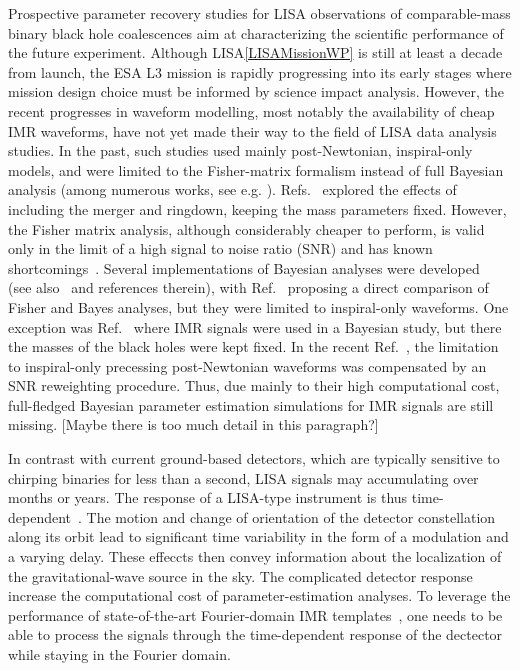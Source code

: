 \documentclass[aps,showpacs,twocolumn,
prd,superscriptaddress,nofootinbib]{revtex4-1}
\newcommand{\jgb}[1]{{\color{DarkGreen} #1}}
\begin{document}
Prospective parameter recovery studies for LISA observations of comparable-mass binary black hole coalescences aim at characterizing the scientific performance of the future experiment. Although LISA\ref{LISAMissionWP} is still at least a decade from launch, the ESA L3 mission is rapidly progressing into its early stages where mission design choice must be informed by science impact analysis. However, the recent progresses in waveform modelling, most notably the availability of cheap IMR waveforms, have not yet made their way to the field of LISA data analysis studies. In the past, such studies used mainly post-Newtonian, inspiral-only models, and were limited to the Fisher-matrix formalism instead of full Bayesian analysis (among numerous works, see e.g. \cite{Cutler97,LISAPE09}). Refs.~\cite{McWilliams+09,McWilliams+10,McWilliams+11} explored the effects of including the merger and ringdown, keeping the mass parameters fixed. However, the Fisher matrix analysis, although considerably cheaper to perform, is valid only in the limit of a high signal to noise ratio (SNR) and has known shortcomings~\cite{Vallisneri08}. Several implementations of Bayesian analyses were developed~\cite{CP06,Wickham+06,Babak+08,GP09,Feroz+09,Petiteau+10,PC13} (see also~\cite{MLDC4} and references therein), with Ref.~\cite{PC15} proposing a direct comparison of Fisher and Bayes analyses, but they were limited to inspiral-only waveforms. One exception was Ref.~\cite{Babak+08} where IMR signals were used in a Bayesian study, but there the masses of the black holes were kept fixed. In the recent Ref.~\cite{Klein+15}, the limitation to inspiral-only precessing post-Newtonian waveforms was compensated by an SNR reweighting procedure. Thus, due mainly to their high computational cost, full-fledged Bayesian parameter estimation simulations for IMR signals are still missing. \jgb{[Maybe there is too much detail in this paragraph?]}

In contrast with current ground-based detectors, which are typically sensitive to chirping binaries for less than a second, LISA signals may accumulating over months or years.
The response of a LISA-type instrument is thus time-dependent~\cite{Cutler97}.
The motion and change of orientation of the detector constellation along its orbit lead to significant time variability in the form of a modulation and a varying delay. These effeccts then convey information about the localization of the gravitational-wave source in the sky. The complicated detector response increase the computational cost of parameter-estimation analyses. To leverage the performance of state-of-the-art Fourier-domain IMR templates~\cite{BTB16,Khan+15}, one needs to be able to process the signals through the time-dependent response of the dectector while staying in the Fourier domain.
\end{document}
